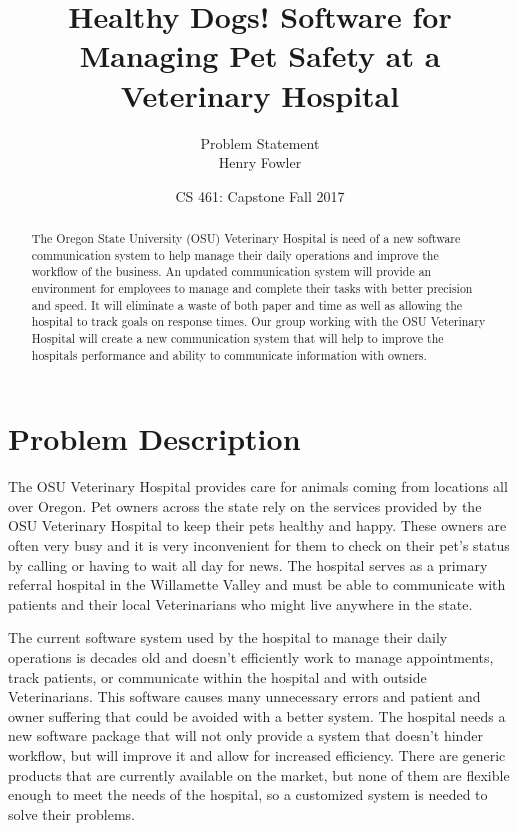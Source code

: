 \documentclass[letterpaper,10pt,draftclsnofoot,onecolumn]{article}
\begin{document}
\title{Healthy Dogs! Software for Managing Pet Safety at a Veterinary Hospital}
\author{Problem Statement \\ \newline Henry Fowler}
\date{CS 461: Capstone Fall 2017}
\maketitle

\begin{abstract}
The Oregon State University (OSU) Veterinary Hospital is need of a new software communication system to help manage their daily operations and improve the workflow of the business. An updated communication system will provide an environment for employees to manage and complete their tasks with better precision and speed. It will eliminate a waste of both paper and time as well as allowing the hospital to track goals on response times. Our group working with the OSU Veterinary Hospital will create a new communication system that will help to improve the hospitals performance and ability to communicate information with owners. 
\end{abstract}

\pagebreak


\section{Problem Description}
The OSU Veterinary Hospital provides care for animals coming from locations all over Oregon. Pet owners across the state rely on the services provided by the OSU Veterinary Hospital to keep their pets healthy and happy. These owners are often very busy and it is very inconvenient for them to check on their pet’s status by calling or having to wait all day for news. The hospital serves as a primary referral hospital in the Willamette Valley and must be able to communicate with patients and their local Veterinarians who might live anywhere in the state.

The current software system used by the hospital to manage their daily operations is decades old and doesn’t efficiently work to manage appointments, track patients, or communicate within the hospital and with outside Veterinarians. This software causes many unnecessary errors and patient and owner suffering that could be avoided with a better system. The hospital needs a new software package that will not only provide a system that doesn’t hinder workflow, but will improve it and allow for increased efficiency. There are generic products that are currently available on the market, but none of them are flexible enough to meet the needs of the hospital, so a customized system is needed to solve their problems.
\end{document}
